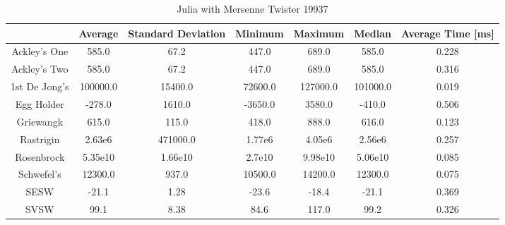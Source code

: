 \documentclass{article}
\begin{document}
            \begin{table}[h!] \label{tbl:julia_mersenne}
                \begin{centering}
                    \begin{tabular}{|c||c|c|c|c|c|c|}
                        \hline
                                    & Average & Standard Deviation & Minimum & Maximum & Median & Average Time [ms] \\
                        \hline
                        \hline
                        Ackley's One & 585.0  & 67.2               & 447.0   & 689.0   & 585.0  & 0.228 \\
                        \hline
                        Ackley's Two & 585.0  & 67.2               & 447.0   & 689.0   & 585.0  & 0.316 \\
                        \hline
                        1st De Jong's & 100000.0 & 15400.0         & 72600.0 & 127000.0 & 101000.0 & 0.019 \\
                        \hline
                        Egg Holder    & -278.0   & 1610.0          & -3650.0 & 3580.0   & -410.0   & 0.506 \\
                        \hline
                        Griewangk     & 615.0    & 115.0           & 418.0   & 888.0    & 616.0    & 0.123 \\
                        \hline
                        Rastrigin     & 2.63e6   & 471000.0        & 1.77e6  & 4.05e6   & 2.56e6   & 0.257 \\
                        \hline
                        Rosenbrock    & 5.35e10  & 1.66e10         & 2.7e10  & 9.98e10  & 5.06e10  & 0.085\\
                        \hline
                        Schwefel's    & 12300.0  & 937.0           & 10500.0 & 14200.0  & 12300.0  & 0.075 \\
                        \hline
                        SESW          & -21.1    & 1.28            & -23.6   & -18.4    & -21.1    & 0.369\\
                        \hline
                        SVSW          & 99.1     & 8.38            & 84.6    & 117.0    & 99.2     & 0.326 \\
                        \hline
                    \end{tabular}
                    \caption{Julia with Mersenne Twister 19937}
                \end{centering}
                \end{table}
\end{document}
